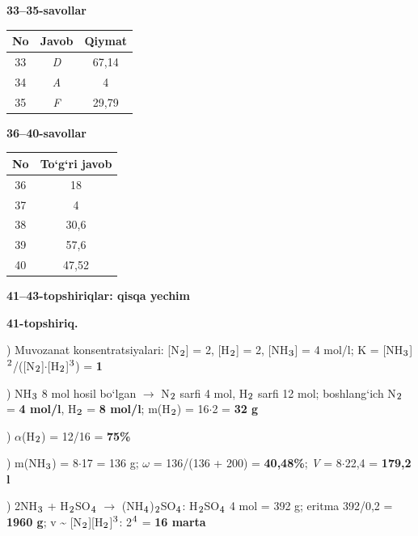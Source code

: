 \documentclass[11pt,a4paper]{article}
\renewcommand{\textsubscript}[1]{\ensuremath{_{\text{\fontsize{8}{8}\selectfont #1}}}}
\renewcommand{\textsuperscript}[1]{\ensuremath{^{\text{\fontsize{8}{8}\selectfont #1}}}}
\begin{document}
\noindent\textbf{33--35-savollar}\par\smallskip
\noindent\begin{tabular}{|c|c|c|}\hline \textbf{No} & \textbf{Javob} & \textbf{Qiymat}\\\hline
33 & \textsl{D} & 67,14\\\hline
34 & \textsl{A} & 4\\\hline
35 & \textsl{F} & 29,79\\\hline
\end{tabular}\par\medskip
\noindent\textbf{36--40-savollar}\par\smallskip
\noindent\begin{tabular}{|c|c|}\hline \textbf{No} & \textbf{To`g`ri javob}\\\hline
36 & 18\\\hline
37 & 4\\\hline
38 & 30,6\\\hline
39 & 57,6\\\hline
40 & 47,52\\\hline
\end{tabular}\par\medskip
\noindent\textbf{41--43-topshiriqlar: qisqa yechim}\par\smallskip
\noindent\textbf{41-topshiriq.}\par
{}) Muvozanat konsentratsiyalari: [N\textsubscript{2}] = 2, [H\textsubscript{2}] = 2, [NH\textsubscript{3}] = 4 mol/l; K = [NH\textsubscript{3}]\textsuperscript{2}/([N\textsubscript{2}]$\cdot$[H\textsubscript{2}]\textsuperscript{3}) = \textbf{1}\par
{}) NH\textsubscript{3} 8 mol hosil bo`lgan $\to$ N\textsubscript{2} sarfi 4 mol, H\textsubscript{2} sarfi 12 mol; boshlang`ich N\textsubscript{2} = \textbf{4 mol/l}, H\textsubscript{2} = \textbf{8 mol/l}; m(H\textsubscript{2}) = 16$\cdot$2 = \textbf{32 g}\par
{}) $\alpha$(H\textsubscript{2}) = 12/16 = \textbf{75\%}\par
{}) m(NH\textsubscript{3}) = 8$\cdot$17 = 136 g; $\omega$ = 136/(136 + 200) = \textbf{40,48\%}; \textit{V} = 8$\cdot$22,4 = \textbf{179,2 l}\par
{}) 2NH\textsubscript{3} + H\textsubscript{2}SO\textsubscript{4} $\to$ (NH\textsubscript{4})\textsubscript{2}SO\textsubscript{4}: H\textsubscript{2}SO\textsubscript{4} 4 mol = 392 g; eritma 392/0,2 = \textbf{1960 g}; v \textasciitilde{} [N\textsubscript{2}][H\textsubscript{2}]\textsuperscript{3}: 2\textsuperscript{4} = \textbf{16 marta}\par
\end{document}
